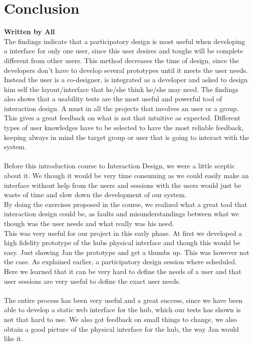 \chapter{Conclusion}
\textbf{Written by All}\\
The findings indicate that a participatory design is most useful when developing a interface for only one user, since this user desires and toughs will be complete different from other users. This method decreases the time of design, since the developers don't have to develop several prototypes until it meets the user needs. Instead the user is a co-designer, is integrated as a developer and asked to design him self the layout/interface that he/she think he/she may need. The findings also shows that a usability tests are the most useful and powerful tool of interaction design. A must in all the projects that involves an user or a group. This gives a great feedback on what is not that intuitive as expected. Different types of user knowledges have to be selected to have the most reliable feedback, keeping always in mind the target group or user that is going to interact with the system.
\\\\
Before this introduction course to Interaction Design, we were a little sceptic about it. We though it would be very time consuming as we could easily make an interface without help from the users and sessions with the users would just be waste of time and slow down the development of our system.\\
By doing the exercises proposed in the course, we realized what a great tool that interaction design could be, as faults and misunderstandings between what we though was the user needs and what really was his need.\\
This was very useful for our project in this early phase. At first we developed a high fidelity prototype of the hubs physical interface and though this would be easy. Just showing Jan the prototype and get a thumbs up. This was however not the case. As explained earlier, a participatory design session where scheduled. Here we learned that it can be very hard to define the needs of a user and that user sessions are very useful to define the exact user needs.
\\\\
The entire process has been very useful and a great success, since we have been able to develop a static web interface for the hub, which our tests has shown is not that hard to use. We also got feedback on small things to change, we also obtain a good picture of the physical interface for the hub, the way Jan would like it.

